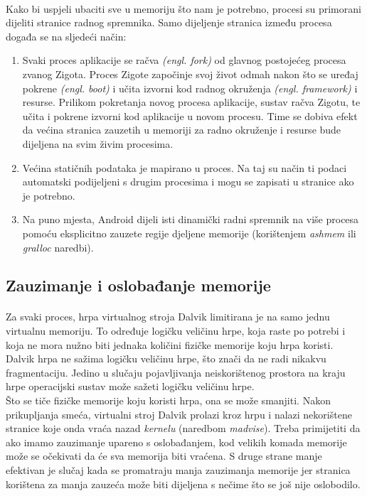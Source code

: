 \documentclass[times, utf8, zavrsni]{fer}
\begin{document}
\paragraph{}
Kako bi uspjeli ubaciti sve u memoriju što nam je potrebno, procesi su primorani dijeliti stranice radnog spremnika. Samo dijeljenje stranica između procesa događa se na sljedeći način:

\begin{enumerate}
\item
Svaki proces aplikacije se račva \textit{(engl. fork)} od glavnog postojećeg procesa zvanog Zigota. Proces Zigote započinje svoj život odmah nakon što se uređaj pokrene \textit{(engl. boot)} i učita izvorni kod radnog okruženja \textit{(engl. framework)} i resurse. Prilikom pokretanja novog procesa aplikacije, sustav račva Zigotu, te učita i pokrene izvorni kod aplikacije u novom procesu. Time se dobiva efekt da većina stranica zauzetih u memoriji za radno okruženje i resurse bude dijeljena na svim živim procesima.

\item
Većina statičnih podataka je mapirano u proces. Na taj su način ti podaci automatski podijeljeni s drugim procesima i mogu se zapisati u stranice ako je potrebno.

\item
Na puno mjesta, Android dijeli isti dinamički radni spremnik na više procesa pomoću eksplicitno zauzete regije djeljene memorije (korištenjem \textit{ashmem} ili \textit{gralloc} naredbi).
\end{enumerate}

\subsection{Zauzimanje i oslobađanje memorije}
\paragraph{}
Za svaki proces, hrpa virtualnog stroja Dalvik limitirana je na samo jednu virtualnu memoriju. To određuje logičku veličinu hrpe, koja raste po potrebi i koja ne mora nužno biti jednaka količini fizičke memorije koju hrpa koristi. Dalvik hrpa ne sažima logičku veličinu hrpe, što znači da ne radi nikakvu fragmentaciju. Jedino u slučaju pojavljivanja neiskorištenog prostora na kraju hrpe operacijski sustav može sažeti logičku veličinu hrpe.\\

Što se tiče fizičke memorije koju koristi hrpa, ona se može smanjiti. Nakon prikupljanja smeća, virtualni stroj Dalvik prolazi kroz hrpu i nalazi nekorištene stranice koje onda vraća nazad \textit{kernelu} (naredbom \textit{madvise}). Treba primijetiti da ako imamo zauzimanje upareno s oslobađanjem, kod velikih komada memorije može se očekivati da će sva memorija biti vraćena. S druge strane manje efektivan je slučaj kada se promatraju manja zauzimanja memorije jer stranica korištena za manja zauzeća može biti dijeljena s nečime što se još nije oslobodilo.
\end{document}
